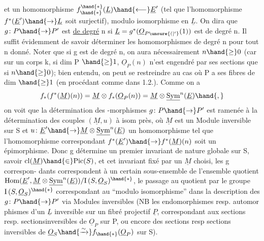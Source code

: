 
et  un homomorphisme  $f^{\hand{*}}_{\hand{*}}(\underline{L}) \hand{\longleftarrow} \underline{E}'$  (tel que l'homomorphisme 
$f^{*}(\underline{E}') \hand{\to} \underline{L}$  soit surjectif), modulo  isomorphisme en $\underline{L}$.  On dira que
$g\colon P \hand{\to} P'$  est \uline{de degré} n si $\underline{L} = g^{*}(\underline{O}_{P\unsure{(|'}}(1))$  est de degré n. Il suffit
évidemment de savoir déterminer les homomorphismes de degré n pour tout n
donné.  Noter que si g est de degré n, on aura nécessairement $n \hand{\geq} 0$
(car  sur un corps k,  si dim P $\hand{\geq} 1$, $\underline{O}_P(n)$ n'est engendré par ses
sections que si $n \hand{\geq} 0$); bien entendu, on peut  se restreindre au cas
où P a ses fibres de dim $\hand{\geq} 1$ (en procédant comme dans 1.2.).  Comme on a
\[ f_{*}(f^{*}(\underline{M})(n)) = \underline{M} \otimes f_{*}(\underline{O}_P(n)) = \underline{M} \otimes \underline{\mathrm{Sym}}^{n}(\underline{E}) \hand{,} \]
on voit que la détermination des -morphismes  $g\colon P \hand{\to} P'$  est ramenée
à la détermination des couples $(\underline{M},u)$ à isom près, où $\underline{M}$  est un Module
inversible sur S et  $u\colon \underline{E}' \hand{\to} \underline{M}\otimes\underline{\mathrm{Sym}}^{n}(\underline{E})$  un homomorphisme  tel que
l'homomorphisme correspondant  $f^{*}(\underline{E}') \hand{\to} f^{*}(\underline{M})(n)$  soit un épimorphisme.
Donc  g détermine un premier invariant de nature globale sur S, savoir
$\mathrm{cl}(\underline{M}) \hand{\in} \mathrm{Pic}(S)$, et cet invariant fixé par un $\underline{M}$ choisi,  les g correspon-%
dants correspondent à un certain sous-ensemble de l'ensemble quotient
$\mathrm{Hom}(\underline{E}',\underline{M}\otimes\underline{\mathrm{Sym}}^{n}(\underline{E}))/\mathrm{I}\,(S,\underline{O}_S)^{\hand{*}}$,  le passage au quotient par le groupe
$\mathrm{I}\,(S,\underline{O}_S)^{\hand{*}}$ correspondant  au  ``modulo isomorphisme'' dans la description
des $g\colon P \hand{\to} P'$ via Modules inversibles  (NB  les endomorphismes resp. automor
phismes d'un $\underline{L}$ inversible sur un fibré projectif $\underline{P}$, correspondant aux
sections resp. sections\hand{/}inversibles de $\underline{O}_P$ sur P,  ou encore des sections
resp sections inversibles de $\underline{O}_S \hand{\xrightarrow{\sim}} f_{\hand{*}}(\underline{O}_P)$ sur S).


